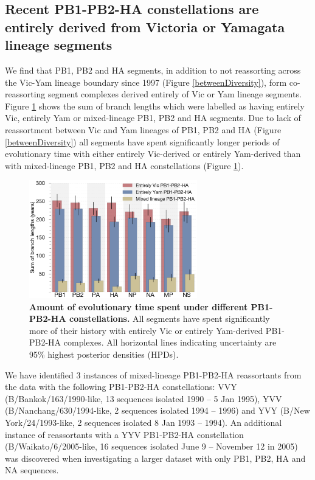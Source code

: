 \documentclass[11pt,oneside,letterpaper]{article}
\begin{document}
\subsection*{Recent PB1-PB2-HA constellations are entirely derived from Victoria or Yamagata lineage segments}

We find that PB1, PB2 and HA segments, in addition to not reassorting across the Vic-Yam lineage boundary since 1997 (Figure \ref{betweenDiversity}), form co-reassorting segment complexes derived entirely of Vic or Yam lineage segments.
Figure \ref{stateTime} shows the sum of branch lengths which were labelled as having entirely Vic, entirely Yam or mixed-lineage PB1, PB2 and HA segments.
Due to lack of reassortment between Vic and Yam lineages of PB1, PB2 and HA (Figure \ref{betweenDiversity}) all segments have spent significantly longer periods of evolutionary time with either entirely Vic-derived or entirely Yam-derived than with mixed-lineage PB1, PB2 and HA constellations (Figure \ref{stateTime}).

\begin{figure}[h]
	\centering		
	\includegraphics[width=0.65\textwidth]{figures/InfB_stateTime.png}
	\caption{\textbf{Amount of evolutionary time spent under different PB1-PB2-HA constellations.}
All segments have spent significantly more of their history with entirely Vic or entirely Yam-derived PB1-PB2-HA complexes.
All horizontal lines indicating uncertainty are 95\% highest posterior densities (HPDs).}
	\label{stateTime}
\end{figure}

We have identified 3 instances of mixed-lineage PB1-PB2-HA reassortants from the data with the following PB1-PB2-HA constellations: VVY (B/Bankok/163/1990-like, 13 sequences isolated 1990 -- 5 Jan 1995), YVV (B/Nanchang/630/1994-like, 2 sequences isolated 1994 -- 1996) and YVY (B/New York/24/1993-like, 2 sequences isolated 8 Jan 1993 -- 1994).
An additional instance of reassortants with a YYV PB1-PB2-HA constellation (B/Waikato/6/2005-like, 16 sequences isolated June 9 -- November 12 in 2005) was discovered when investigating a larger dataset with only PB1, PB2, HA and NA sequences.
\end{document}
